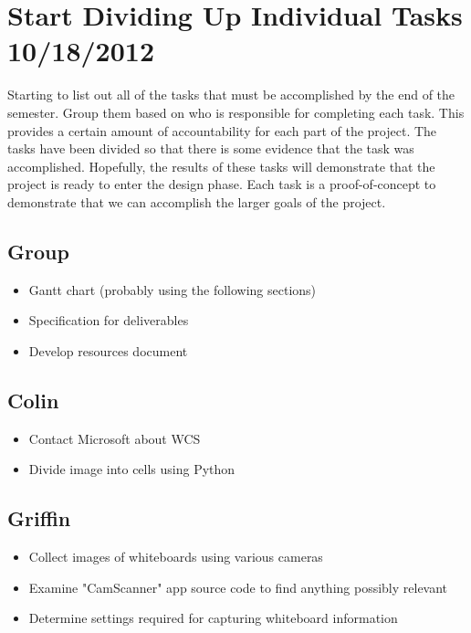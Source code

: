\documentclass[]{article}
\begin{document}
	
	\section{Start Dividing Up Individual Tasks 10/18/2012}
		Starting to list out all of the tasks that must be accomplished by the end of the semester. Group them based on who is responsible for completing each task. This provides a certain amount of accountability for each part of the project. The tasks have been divided so that there is some evidence that the task was accomplished. Hopefully, the results of these tasks will demonstrate that the project is ready to enter the design phase. Each task is a proof-of-concept to demonstrate that we can accomplish the larger goals of the project.
		
		\subsection{Group}
			\begin{itemize}
				\item Gantt chart (probably using the following sections)
				\item Specification for deliverables
				\item Develop resources document
			\end{itemize}
	
		\subsection{Colin}
			\begin{itemize}
				\item Contact Microsoft about WCS
				\item Divide image into cells using Python
			\end{itemize}
		
		
		\subsection{Griffin}
			\begin{itemize}
				\item Collect images of whiteboards using various cameras
				\item Examine "CamScanner" app source code to find anything possibly relevant
				\item Determine settings required for capturing whiteboard information
			\end{itemize}
		
\end{document}
